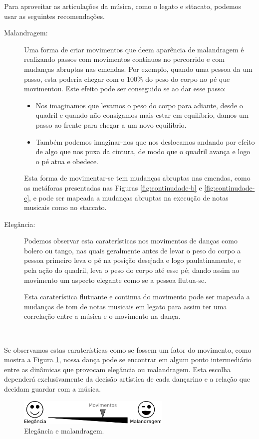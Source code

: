 Para aproveitar as articulações da música, como o legato e sttacato,
podemos usar as seguintes recomendações.\\
\begin{description}
\item[Malandragem:] Uma forma de criar movimentos que deem aparência de malandragem 
é realizando passos com movimentos contínuos no percorrido e com mudanças abruptas nas emendas.
Por exemplo, quando uma pessoa da um passo, 
esta poderia chegar com o 100\% do peso do corpo no pé que movimentou.
Este efeito pode ser conseguido se ao dar esse passo:
\begin{itemize}
\item Nos imaginamos que levamos o peso do corpo para adiante, desde o quadril 
e quando não consigamos mais estar em equilíbrio, 
damos um passo ao frente para chegar a um novo equilíbrio.
\item Também podemos imaginar-nos 
que nos deslocamos andando por efeito de algo que nos puxa da cintura,
de modo que o quadril avança e logo o pé atua e obedece.
\end{itemize}
Esta forma de movimentar-se tem mudanças abruptas nas emendas,
como as metáforas presentadas nas Figuras \ref{fig:continudade-b} e  \ref{fig:continudade-c},
e pode ser mapeada a mudanças abruptas na execução de notas musicais 
como no staccato.



\item[Elegância:] Podemos observar esta caraterísticas nos movimentos de danças como bolero ou tango,
nas quais geralmente antes de levar o peso do corpo  
a pessoa primeiro leva o pé na posição desejada 
e logo paulatinamente, e pela ação do quadril, leva o peso do corpo até esse pé;
dando assim ao movimento um aspecto elegante como se a pessoa flutua-se. 

Esta caraterística flutuante e continua do movimento 
pode ser mapeada a mudanças de tom de notas musicais em legato 
para assim ter uma correlação entre a música e o movimento na dança.
\end{description}~

Se observamos estas caraterísticas como se fossem um fator do movimento,
como mostra a Figura \ref{fig:malandragem-elegancia},
nossa dança pode se encontrar em algum ponto intermediário entre as dinâmicas que provocam elegância ou malandragem.
Esta escolha dependerá exclusivamente da decisão artística de cada dançarino 
e a relação que decidam guardar com a música.
\begin{figure}[!h]
  \centering
    \includegraphics[width=0.65\textwidth]{chapters/cap-musicalidade/malandragem-elegancia.eps}
\caption{Elegância e malandragem.}
\label{fig:malandragem-elegancia}
\end{figure}


